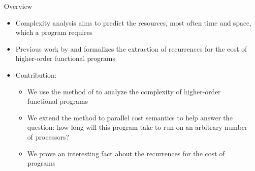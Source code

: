 \documentclass[pdf]{beamer}
\begin{document}
\begin{frame}{Overview}
  \begin{itemize}
    \item<1-> Complexity analysis aims to predict the resources, most often time and space, which a program requires
    \vfill
    \item<1-> Previous work by \citet{Danner2013} and \citet{Danner2015} formalizes the extraction of recurrences for the cost of higher-order functional programs
    \vfill
    \item<1-> Contribution:
      \begin{itemize}
          \item<1-> We use the method of \citet{Danner2015} to analyze the complexity of higher-order functional programs
          \vfill
          \item<1-> We extend the method to parallel cost semantics to help answer the question: how long will this program take to run on an arbitrary number of processors?
          \vfill
          \item<1-> We prove an interesting fact about the recurrences for the cost of programs
        \end{itemize}
  \end{itemize}
\end{frame}
\end{document}
